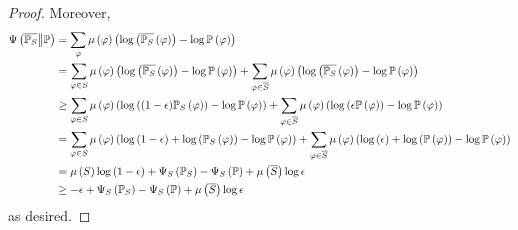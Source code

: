 \documentclass[12pt]{article}
\theoremstyle{definition}
\newcommand{\of}[1]{\left(#1\right)}
\newcommand{\ofcc}[2]{\left(#1\middle\| #2\right)}
\newcommand{\PP}{\mathbb{P}}
\renewcommand{\P}[1]{\mathbb{P}\of{#1}}
\newcommand{\vp}{\varphi}
\newcommand{\regs}[1]{\Psi_S\of{#1}}
\newcommand{\relreg}[2]{\Psi\ofcc{#1}{#2}}
\begin{document}
{\begin{proof}
Moreover,
\begin{align*}
\relreg{\oPPS}{\PP}
&= \sum_{\vp} \mu\of{\vp} \of{\log\of{\oPPS\of{\vp}} - \log{\P{\vp}}} \\
&= \sum_{\vp\in S} \mu\of{\vp} \of{\log\of{\oPPS\of{\vp}} - \log{\P{\vp}}} 
+ \sum_{\vp\in \overline{S}} \mu\of{\vp} \of{\log\of{\oPPS\of{\vp}} - \log{\P{\vp}}} \\
&\geq \sum_{\vp\in S} \mu\of{\vp} \of{\log\of{(1 - \epsilon) \PP_S \of{\vp}} - \log{\P{\vp}}} 
+ \sum_{\vp\in \overline{S}} \mu\of{\vp} \of{\log\of{\epsilon \P{\vp}} - \log{\P{\vp}}}  \\
&= \sum_{\vp\in S} \mu\of{\vp} \of{\log\of{1 - \epsilon} + \log\of{\PP_S \of{\vp}} - \log{\P{\vp}}}
+ \sum_{\vp\in \overline{S}} \mu\of{\vp} \of{\log\of{\epsilon} + \log\of{\P{\vp}} - \log{\P{\vp}}}\\
&= \mu\of{S} \log\of{1 - \epsilon} + \regs{\PP_S} - \regs{\PP} + \muoS \log\epsilon \\
&\geq - \epsilon + \regs{\PP_S} - \regs{\PP} + \muoS \log\epsilon
\end{align*}
as desired.
\end{proof}

}
\end{document}
